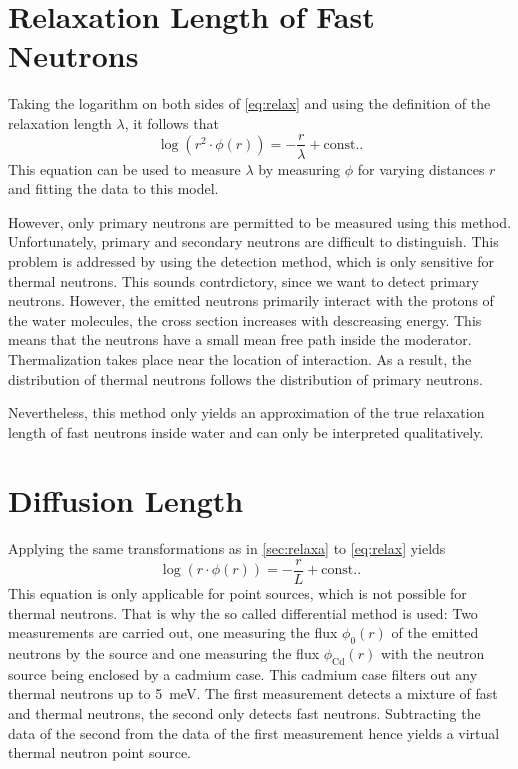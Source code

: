 \section{Relaxation Length of Fast Neutrons}\label{sec:relaxa}
Taking the logarithm on both sides of \autoref{eq:relax} and using the definition of the relaxation length $\lambda$, it follows that
\begin{equation*}
	\log(r^2\cdot\phi(r)) = -\frac{r}{\lambda} + \text{const.}.
\end{equation*}
This equation can be used to measure $\lambda$ by measuring $\phi$ for varying distances $r$ and fitting the data to this model.

However, only primary neutrons are permitted to be measured using this method.
Unfortunately, primary and secondary neutrons are difficult to distinguish.
This problem is addressed by using the  detection method, which is only sensitive for thermal neutrons.
This sounds contrdictory, since we want to detect primary neutrons.
However, the emitted neutrons primarily interact with the protons of the water molecules, the cross section increases with descreasing energy.
This means that the neutrons have a small mean free path inside the moderator.
Thermalization takes place near the location of interaction.
As a result, the distribution of thermal neutrons follows the distribution of primary neutrons.

Nevertheless, this method only yields an approximation of the true relaxation length of fast neutrons inside water and can only be interpreted qualitatively.

\section{Diffusion Length}
Applying the same transformations as in \autoref{sec:relaxa} to \autoref{eq:relax} yields
\begin{equation*}
	\log(r\cdot\phi(r)) = -\frac{r}{L} + \text{const.}.
\end{equation*}
This equation is only applicable for point sources, which is not possible for thermal neutrons.
That is why the so called  differential method is used:
Two measurements are carried out, one measuring the flux $\phi_0(r)$ of the emitted neutrons by the source and one measuring the flux $\phi_\text{Cd}(r)$ with the neutron source being enclosed by a cadmium case.
This cadmium case filters out any thermal neutrons up to \SI{5}{meV}.
The first measurement detects a mixture of fast and thermal neutrons, the second only detects fast neutrons.
Subtracting the data of the second from the data of the first measurement hence yields a virtual thermal neutron point source.


